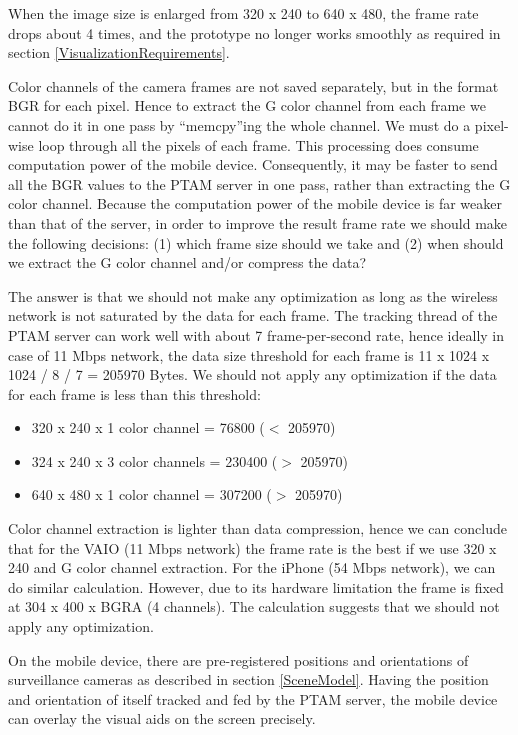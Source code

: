 When the image size is enlarged from 320 x 240 to 640 x 480, the frame rate drops about 4 times, and the prototype no longer works smoothly as required in section \ref{VisualizationRequirements}.

Color channels of the camera frames are not saved separately, but in the format BGR for each pixel. Hence to extract the G color channel from each frame we cannot do it in one pass by ``memcpy''ing the whole channel. We must do a pixel-wise loop through all the pixels of each frame. This processing does consume computation power of the mobile device. Consequently, it may be faster to send all the BGR values to the PTAM server in one pass, rather than extracting the G color channel. Because the computation power of the mobile device is far weaker than that of the server, in order to improve the result frame rate we should make the following decisions: (1) which frame size should we take and (2) when should we extract the G color channel and/or compress the data?

The answer is that we should not make any optimization as long as the wireless network is not saturated by the data for each frame. The tracking thread of the PTAM server can work well with about 7 frame-per-second rate, hence ideally in case of 11 Mbps network, the data size threshold for each frame is 11 x 1024 x 1024 / 8 / 7 = 205970 Bytes. We should not apply any optimization if the data for each frame is less than this threshold:

\begin{itemize}
	\item 320 x 240 x 1 color channel = 76800 ($<$ 205970)
	\item 324 x 240 x 3 color channels = 230400 ($>$ 205970)
	\item 640 x 480 x 1 color channel = 307200 ($>$ 205970)
\end{itemize}

Color channel extraction is lighter than data compression, hence we can conclude that for the VAIO (11 Mbps network) the frame rate is the best if we use 320 x 240 and G color channel extraction. For the iPhone (54 Mbps network), we can do similar calculation. However, due to its hardware limitation the frame is fixed at 304 x 400 x BGRA (4 channels). The calculation suggests that we should not apply any optimization.

On the mobile device, there are pre-registered positions and orientations of surveillance cameras as described in section \ref{SceneModel}. Having the position and orientation of itself tracked and fed by the PTAM server, the mobile device can overlay the visual aids on the screen precisely.

